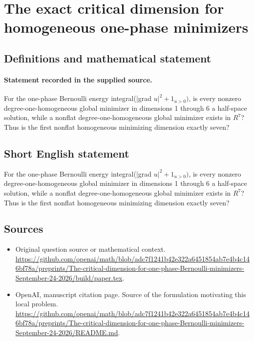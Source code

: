 \documentclass[11pt]{article}
\begin{document}
\section*{The exact critical dimension for homogeneous one-phase minimizers}\label{30007331}
\subsection{Definitions and mathematical statement}
\paragraph{Statement recorded in the supplied source.}
For the one-phase Bernoulli energy integral(|grad $u|^2+1_{u>0})$, is every nonzero degree-one-homogeneous global minimizer in dimensions 1 through 6 a half-space solution, while a nonflat degree-one-homogeneous global minimizer exists in $R^7$? Thus is the first nonflat homogeneous minimizing dimension exactly seven?
\subsection{Short English statement}
For the one-phase Bernoulli energy integral(|grad $u|^2+1_{u>0})$, is every nonzero degree-one-homogeneous global minimizer in dimensions 1 through 6 a half-space solution, while a nonflat degree-one-homogeneous global minimizer exists in $R^7$? Thus is the first nonflat homogeneous minimizing dimension exactly seven?
\subsection{Sources}
\begin{itemize}
\item[S1] Original question source or mathematical context.
\url{https://github.com/openai/math/blob/adc7f1241b42e322a6451854ab7e4b4c146bf78a/preprints/The-critical-dimension-for-one-phase-Bernoulli-minimizers-September-24-2026/build/paper.tex}.
\item[S2] OpenAI, manuscript citation page. Source of the formulation motivating this local problem.
\url{https://github.com/openai/math/blob/adc7f1241b42e322a6451854ab7e4b4c146bf78a/preprints/The-critical-dimension-for-one-phase-Bernoulli-minimizers-September-24-2026/README.md}.
\end{itemize}
\end{document}
